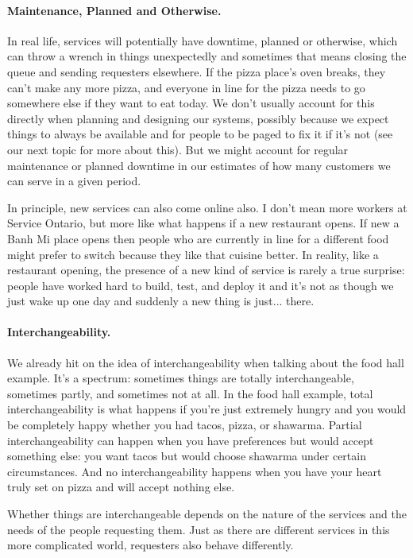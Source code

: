 \documentclass[a4paper]{report}
\begin{document}
\paragraph{Maintenance, Planned and Otherwise.}
In real life, services will potentially have downtime, planned or otherwise, which can throw a wrench in things unexpectedly and sometimes that means closing the queue and sending requesters elsewhere. If the pizza place's oven breaks, they can't make any more pizza, and everyone in line for the pizza needs to go somewhere else if they want to eat today. We don't usually account for this directly when planning and designing our systems, possibly because we expect things to always be available and for people to be paged to fix it if it's not (see our next topic for more about this). But we might account for regular maintenance or planned downtime in our estimates of how many customers we can serve in a given period.

In principle, new services can also come online also. I don't mean more workers at Service Ontario, but more like what happens if a new restaurant opens. If new a Banh Mi place opens then people who are currently in line for a different food might prefer to switch because they like that cuisine better. In reality, like a restaurant opening, the presence of a new kind of service is rarely a true surprise: people have worked hard to build, test, and deploy it and it's not as though we just wake up one day and suddenly a new thing is just... there.

\paragraph{Interchangeability.} We already hit on the idea of interchangeability when talking about the food hall example. It's a spectrum: sometimes things are totally interchangeable, sometimes partly, and sometimes not at all. In the food hall example, total interchangeability is what happens if you're just extremely hungry and you would be completely happy whether you had tacos, pizza, or shawarma.  Partial interchangeability can happen when you have preferences but would accept something else: you want tacos but would choose shawarma under certain circumstances. And no interchangeability happens when you have your heart truly set on pizza and will accept nothing else.

Whether things are interchangeable depends on the nature of the services and the needs of the people requesting them. Just as there are different services in this more complicated world, requesters also behave differently.
\end{document}
